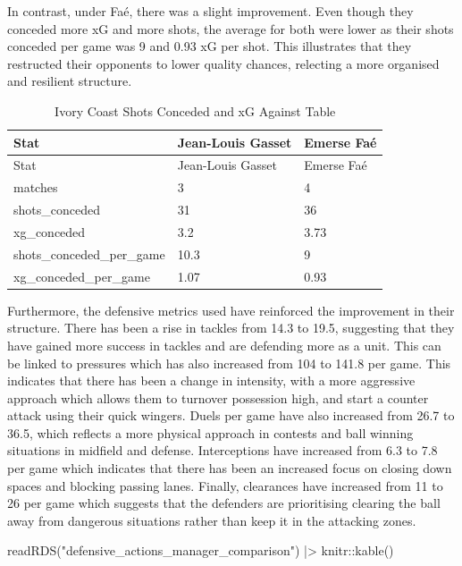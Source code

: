 \documentclass[
  11pt,
  letterpaper,
  DIV=11,
  numbers=noendperiod]{scrartcl}
\newenvironment{Shaded}{\begin{snugshade}}{\end{snugshade}}
\newcommand{\FunctionTok}[1]{\textcolor[rgb]{0.28,0.35,0.67}{#1}}
\newcommand{\NormalTok}[1]{\textcolor[rgb]{0.00,0.23,0.31}{#1}}
\newcommand{\SpecialCharTok}[1]{\textcolor[rgb]{0.37,0.37,0.37}{#1}}
\newcommand{\StringTok}[1]{\textcolor[rgb]{0.13,0.47,0.30}{#1}}
\begin{document}
In contrast, under Faé, there was a slight improvement. Even though they
conceded more xG and more shots, the average for both were lower as
their shots conceded per game was 9 and 0.93 xG per shot. This
illustrates that they restructed their opponents to lower quality
chances, relecting a more organised and resilient structure.

\begin{longtable}[]{@{}lll@{}}
\caption{Ivory Coast Shots Conceded and xG Against Table}\tabularnewline
\toprule\noalign{}
Stat & Jean-Louis Gasset & Emerse Faé \\
\midrule\noalign{}
\endfirsthead
\toprule\noalign{}
Stat & Jean-Louis Gasset & Emerse Faé \\
\midrule\noalign{}
\endhead
\bottomrule\noalign{}
\endlastfoot
matches & 3 & 4 \\
shots\_conceded & 31 & 36 \\
xg\_conceded & 3.2 & 3.73 \\
shots\_conceded\_per\_game & 10.3 & 9 \\
xg\_conceded\_per\_game & 1.07 & 0.93 \\
\end{longtable}

Furthermore, the defensive metrics used have reinforced the improvement
in their structure. There has been a rise in tackles from 14.3 to 19.5,
suggesting that they have gained more success in tackles and are
defending more as a unit. This can be linked to pressures which has also
increased from 104 to 141.8 per game. This indicates that there has been
a change in intensity, with a more aggressive approach which allows them
to turnover possession high, and start a counter attack using their
quick wingers. Duels per game have also increased from 26.7 to 36.5,
which reflects a more physical approach in contests and ball winning
situations in midfield and defense. Interceptions have increased from
6.3 to 7.8 per game which indicates that there has been an increased
focus on closing down spaces and blocking passing lanes. Finally,
clearances have increased from 11 to 26 per game which suggests that the
defenders are prioritising clearing the ball away from dangerous
situations rather than keep it in the attacking zones.

\begin{Shaded}
\begin{Highlighting}[]
\FunctionTok{readRDS}\NormalTok{(}\StringTok{"defensive\_actions\_manager\_comparison"}\NormalTok{) }\SpecialCharTok{|\textgreater{}}\NormalTok{ knitr}\SpecialCharTok{::}\FunctionTok{kable}\NormalTok{()}
\end{Highlighting}
\end{Shaded}
\end{document}
